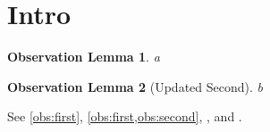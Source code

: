 \documentclass{wrapper}
\begin{document}
\wrapperclass\articleclass\layoutmode\hypermode
\newtheorem{oblemma}{Observation Lemma}
\section{Intro}
\begin{oblemma}\label{obs:first}
a
\end{oblemma}
\begin{oblemma}[Updated Second]\label{obs:second}
b
\end{oblemma}
See \autoref{obs:first}, \cref{obs:first,obs:second}, , and .
\end{document}
